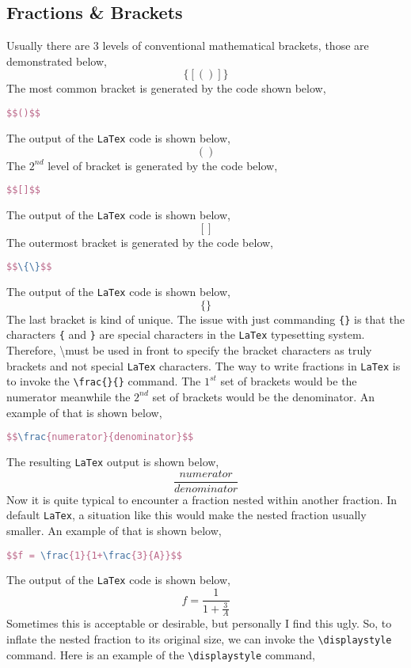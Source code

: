 \documentclass[a4paper, 12pt]{report}
\begin{document}
\begin{center}
\subsection{Fractions \& Brackets} \label{fractions part}
\begin{comment}
\end{comment}
Usually there are $3$ levels of conventional mathematical brackets, those are demonstrated below,
$$\{[()]\}$$
The most common bracket is generated by the code shown below,
\begin{lstlisting}[language=tex]
$$()$$
\end{lstlisting}
The output of the \texttt{LaTex} code is shown below,
$$()$$
The $2^{nd}$ level of bracket is generated by the code below,
\begin{lstlisting}[language=tex]
$$[]$$
\end{lstlisting}
The output of the \texttt{LaTex} code is shown below,
$$[]$$
The outermost bracket is generated by the code below,
\begin{lstlisting}[language=tex]
$$\{\}$$
\end{lstlisting}
The output of the \texttt{LaTex} code is shown below,
$$\{\}$$
The last bracket is kind of unique. The issue with just commanding \texttt{\{\}} is that the characters \texttt{\{} and \texttt{\}} are special characters in the \texttt{LaTex} typesetting system. Therefore, \textbackslash must be used in front to specify the bracket characters as truly brackets and not special \texttt{LaTex} characters.
The way to write fractions in \texttt{LaTex} is to invoke the \texttt{\textbackslash frac\{\}\{\}} command. The $1^{st}$ set of brackets would be the numerator meanwhile the $2^{nd}$ set of brackets would be the denominator. An example of that is shown below,
\begin{lstlisting}[language=tex]
$$\frac{numerator}{denominator}$$
\end{lstlisting}
The resulting \texttt{LaTex} output is shown below,
$$\frac{numerator}{denominator}$$
Now it is quite typical to encounter a fraction nested within another fraction. In default \texttt{LaTex}, a situation like this would make the nested fraction usually smaller. An example of that is shown below,
\begin{lstlisting}[language=tex]
$$f = \frac{1}{1+\frac{3}{A}}$$
\end{lstlisting}
The output of the \texttt{LaTex} code is shown below,
$$f = \frac{1}{1+\frac{3}{A}}$$
Sometimes this is acceptable or desirable, but personally I find this ugly. So, to inflate the nested fraction to its original size, we can invoke the \texttt{\textbackslash displaystyle} command. Here is an example of the \texttt{\textbackslash displaystyle} command,

\end{center}
\end{document}
